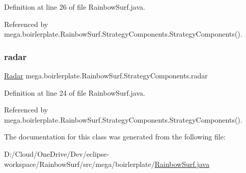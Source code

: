 Definition at line 26 of file Rainbow\+Surf.\+java.



Referenced by mega.\+boirlerplate.\+Rainbow\+Surf.\+Strategy\+Components.\+Strategy\+Components().

\mbox{\label{classmega_1_1boirlerplate_1_1_rainbow_surf_1_1_strategy_components_a5a223484a2bc69f71d62377ed43d8033}} 
\subsubsection{\texorpdfstring{radar}{radar}}
{\footnotesize\ttfamily \hyperlink{classmega_1_1boirlerplate_1_1_radar}{Radar} mega.\+boirlerplate.\+Rainbow\+Surf.\+Strategy\+Components.\+radar}



Definition at line 24 of file Rainbow\+Surf.\+java.



Referenced by mega.\+boirlerplate.\+Rainbow\+Surf.\+Strategy\+Components.\+Strategy\+Components().



The documentation for this class was generated from the following file\+:\begin{DoxyCompactItemize}
\item 
D\+:/\+Cloud/\+One\+Drive/\+Dev/eclipse-\/workspace/\+Rainbow\+Surf/src/mega/boirlerplate/\hyperlink{_rainbow_surf_8java}{Rainbow\+Surf.\+java}\end{DoxyCompactItemize}
